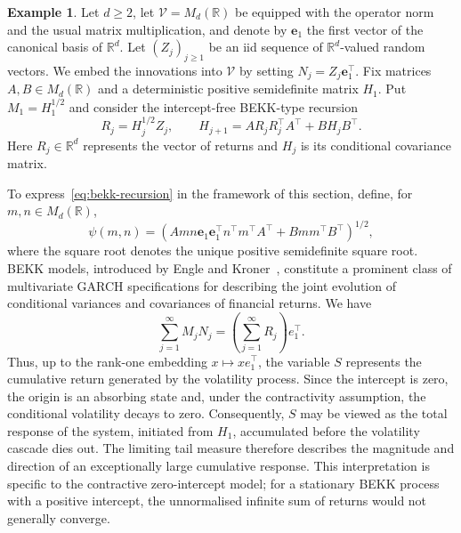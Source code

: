 \documentclass[preprint,12pt]{elsarticle}
\theoremstyle{definition}
\newtheorem{example}[thm]{Example}
\theoremstyle{remark}
\newcommand{\Zbf}{{ Z}}
\newcommand{\Mbf}{{ M}}
\newcommand{\Nbf}{{ N}}
\newcommand{\Sbf}{{ S}}
\newcommand{\Rbf}{{ R}}
\newcommand{\1}{{\mathbf 1}}
\numberwithin{equation}{section}
\newcommand{\Vcal}{\mathcal{V}}
\begin{document}
  \begin{example}
    Let $d\geq2$, let $\Vcal=M_d(\mathbb{R})$ be equipped with the
    operator norm and the usual matrix multiplication, and denote by
    $\mathbf{e}_1$ the first vector of the canonical basis of $\mathbb{R}^d$.
    Let $(\Zbf_j)_{j\geq1}$ be an iid sequence of $\mathbb{R}^d$-valued
    random vectors.
    We embed the innovations into $\Vcal$ by setting $\Nbf_j=\Zbf_j\mathbf{e}_1^\top$.
    Fix matrices $A,B\in M_d(\mathbb{R})$ and a deterministic positive
    semidefinite matrix $H_1$. Put $\Mbf_1=H_1^{1/2}$
    and consider the intercept-free BEKK-type recursion
    \begin{equation}\label{eq:bekk-recursion}
    \Rbf_j
    =
    H_j^{1/2}\Zbf_j,
    \qquad
    H_{j+1}
    =
    A\Rbf_j\Rbf_j^\top A^\top
    +
    BH_jB^\top.
  \end{equation}
  Here $\Rbf_j\in\mathbb{R}^d$ represents the vector of returns and
  $H_j$ is its conditional covariance matrix.

  To express~\eqref{eq:bekk-recursion} in the framework of this
  section, define, for $m,n\in M_d(\mathbb{R})$,
  \begin{equation*}
    \psi(m,n)
    =
    \left(
      Amn\mathbf{e}_1\mathbf{e}_1^\top n^\top m^\top A^\top
      +
      Bmm^\top B^\top
    \right)^{1/2},
  \end{equation*}
  where the square root denotes the unique positive semidefinite
  square root. BEKK models, introduced by Engle and Kroner~\cite{engle1995multivariate}, constitute a prominent class of multivariate GARCH specifications for describing the joint evolution of conditional variances and covariances of financial returns.
  We have
  \begin{equation*}
    \sum_{j=1}^{\infty}\Mbf_j\Nbf_j = \left(\sum_{j=1}^{\infty}R_j\right)e_1^\top.
  \end{equation*}
   Thus, up to the rank-one embedding $x\mapsto xe_1^\top$, the variable $\Sbf$ represents the cumulative return generated by the volatility process. Since the intercept is zero, 
   the origin is an absorbing state and, 
   under the contractivity assumption, the conditional volatility decays to zero. 
   Consequently, $\Sbf$ may be viewed as the total response of the system, initiated from $H_1$, accumulated before the volatility cascade dies out. 
   The limiting tail measure therefore describes the magnitude and direction of an exceptionally large 
   cumulative response. This interpretation is specific to the contractive zero-intercept model; for a stationary BEKK process with a positive intercept, the unnormalised infinite sum of returns would not generally converge.
  \end{example}
\end{document}
